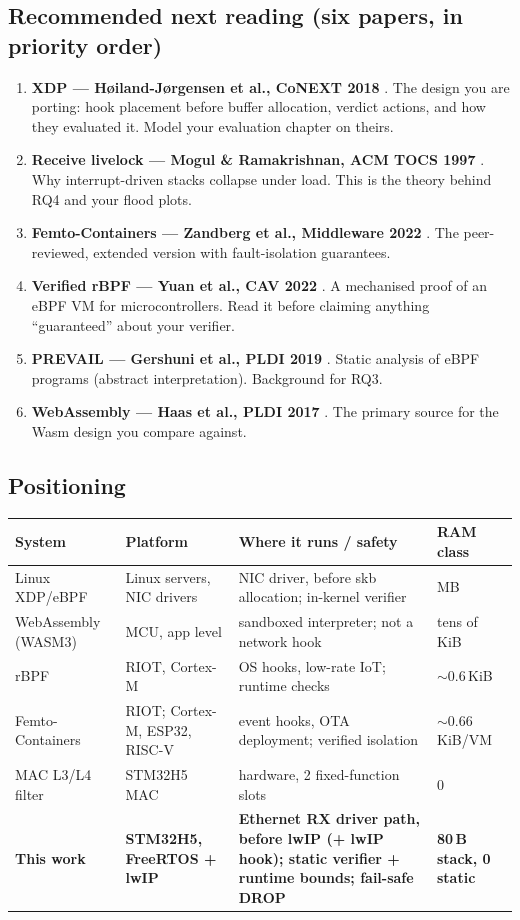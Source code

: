 \documentclass[10pt,a4paper]{article}
\begin{document}
\subsection{Recommended next reading (six papers, in priority order)}
\begin{enumerate}[leftmargin=1.6em]
  \item \textbf{XDP --- Høiland-Jørgensen et al., CoNEXT 2018} \cite{xdp18}. The design you are porting: hook placement before buffer allocation, verdict actions, and how they evaluated it. Model your evaluation chapter on theirs.
  \item \textbf{Receive livelock --- Mogul \& Ramakrishnan, ACM TOCS 1997} \cite{mogul97}. Why interrupt-driven stacks collapse under load. This is the theory behind RQ4 and your flood plots.
  \item \textbf{Femto-Containers --- Zandberg et al., Middleware 2022} \cite{fc22}. The peer-reviewed, extended version with fault-isolation guarantees.
  \item \textbf{Verified rBPF --- Yuan et al., CAV 2022} \cite{cav22}. A mechanised proof of an eBPF VM for microcontrollers. Read it before claiming anything ``guaranteed'' about your verifier.
  \item \textbf{PREVAIL --- Gershuni et al., PLDI 2019} \cite{prevail19}. Static analysis of eBPF programs (abstract interpretation). Background for RQ3.
  \item \textbf{WebAssembly --- Haas et al., PLDI 2017} \cite{wasm17}. The primary source for the Wasm design you compare against.
\end{enumerate}

\subsection{Positioning}
\begin{tabularx}{\textwidth}{@{}P{2.5cm}P{2.5cm}LP{2.4cm}@{}}
\toprule
\textbf{System} & \textbf{Platform} & \textbf{Where it runs / safety} & \textbf{RAM class} \\
\midrule
Linux XDP/eBPF \cite{xdp18} & Linux servers, NIC drivers & NIC driver, before skb allocation; in-kernel verifier & MB \\
WebAssembly (WASM3) \cite{wasm17,fc21} & MCU, app level & sandboxed interpreter; not a network hook & tens of KiB \\
rBPF \cite{rbpf20} & RIOT, Cortex-M & OS hooks, low-rate IoT; runtime checks & $\sim$0.6\,KiB \\
Femto-Containers \cite{fc21,fc22} & RIOT; Cortex-M, ESP32, RISC-V & event hooks, OTA deployment; verified isolation \cite{cav22} & $\sim$0.66\,KiB/VM \\
MAC L3/L4 filter & STM32H5 MAC & hardware, 2 fixed-function slots & 0 \\
\textbf{This work} & \textbf{STM32H5, FreeRTOS + lwIP} & \textbf{Ethernet RX driver path, before lwIP (+ lwIP hook); static verifier + runtime bounds; fail-safe DROP} & \textbf{80\,B stack, 0 static} \\
\bottomrule
\end{tabularx}
\end{document}
